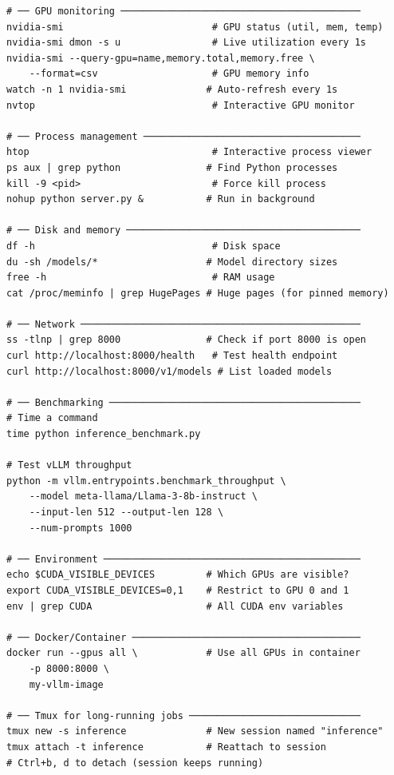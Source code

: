 \documentclass[11pt, twoside, openright]{book}
\begin{document}
\begin{lstlisting}[style=bashstyle, caption={Essential Linux commands for AI engineers}]
# ── GPU monitoring ──────────────────────────────────────────
nvidia-smi                          # GPU status (util, mem, temp)
nvidia-smi dmon -s u                # Live utilization every 1s
nvidia-smi --query-gpu=name,memory.total,memory.free \
    --format=csv                    # GPU memory info
watch -n 1 nvidia-smi              # Auto-refresh every 1s
nvtop                               # Interactive GPU monitor

# ── Process management ──────────────────────────────────────
htop                                # Interactive process viewer
ps aux | grep python               # Find Python processes
kill -9 <pid>                       # Force kill process
nohup python server.py &           # Run in background

# ── Disk and memory ─────────────────────────────────────────
df -h                               # Disk space
du -sh /models/*                   # Model directory sizes
free -h                             # RAM usage
cat /proc/meminfo | grep HugePages # Huge pages (for pinned memory)

# ── Network ─────────────────────────────────────────────────
ss -tlnp | grep 8000               # Check if port 8000 is open
curl http://localhost:8000/health   # Test health endpoint
curl http://localhost:8000/v1/models # List loaded models

# ── Benchmarking ────────────────────────────────────────────
# Time a command
time python inference_benchmark.py

# Test vLLM throughput
python -m vllm.entrypoints.benchmark_throughput \
    --model meta-llama/Llama-3-8b-instruct \
    --input-len 512 --output-len 128 \
    --num-prompts 1000

# ── Environment ─────────────────────────────────────────────
echo $CUDA_VISIBLE_DEVICES         # Which GPUs are visible?
export CUDA_VISIBLE_DEVICES=0,1    # Restrict to GPU 0 and 1
env | grep CUDA                    # All CUDA env variables

# ── Docker/Container ────────────────────────────────────────
docker run --gpus all \            # Use all GPUs in container
    -p 8000:8000 \
    my-vllm-image

# ── Tmux for long-running jobs ──────────────────────────────
tmux new -s inference              # New session named "inference"
tmux attach -t inference           # Reattach to session
# Ctrl+b, d to detach (session keeps running)
\end{lstlisting}
\end{document}
